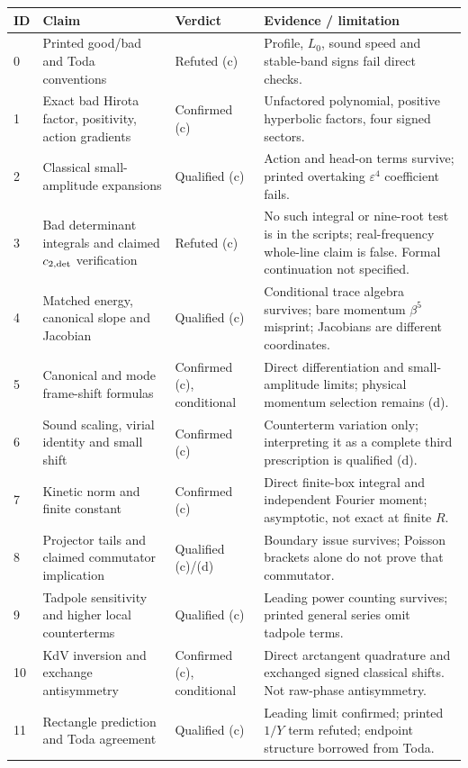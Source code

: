 \documentclass[11pt,a4paper]{article}
\begin{document}
\begin{longtable}{@{}L{.7cm}L{5.7cm}L{2.3cm}L{6.1cm}@{}}
\toprule ID & Claim & Verdict & Evidence / limitation\\\midrule{} & Printed good/bad and Toda conventions & Refuted (c) & Profile, $L_0$, sound speed and stable-band signs fail direct checks.\\
1 & Exact bad Hirota factor, positivity, action gradients & Confirmed (c) & Unfactored polynomial, positive hyperbolic factors, four signed sectors.\\
2 & Classical small-amplitude expansions & Qualified (c) & Action and head-on terms survive; printed overtaking $\varepsilon^4$ coefficient fails.\\
3 & Bad determinant integrals and claimed $c_{2,\rm det}$ verification & Refuted (c) & No such integral or nine-root test is in the scripts; real-frequency whole-line claim is false. Formal continuation not specified.\\
4 & Matched energy, canonical slope and Jacobian & Qualified (c) & Conditional trace algebra survives; bare momentum $\beta^5$ misprint; Jacobians are different coordinates.\\
5 & Canonical and mode frame-shift formulas & Confirmed (c), conditional & Direct differentiation and small-amplitude limits; physical momentum selection remains (d).\\
6 & Sound scaling, virial identity and small shift & Confirmed (c) & Counterterm variation only; interpreting it as a complete third prescription is qualified (d).\\
7 & Kinetic norm and finite constant & Confirmed (c) & Direct finite-box integral and independent Fourier moment; asymptotic, not exact at finite $R$.\\
8 & Projector tails and claimed commutator implication & Qualified (c)/(d) & Boundary issue survives; Poisson brackets alone do not prove that commutator.\\
9 & Tadpole sensitivity and higher local counterterms & Qualified (c) & Leading power counting survives; printed general series omit tadpole terms.\\
10 & KdV inversion and exchange antisymmetry & Confirmed (c), conditional & Direct arctangent quadrature and exchanged signed classical shifts. Not raw-phase antisymmetry.\\
11 & Rectangle prediction and Toda agreement & Qualified (c) & Leading limit confirmed; printed $1/Y$ term refuted; endpoint structure borrowed from Toda.\\

\end{longtable}
\end{document}
